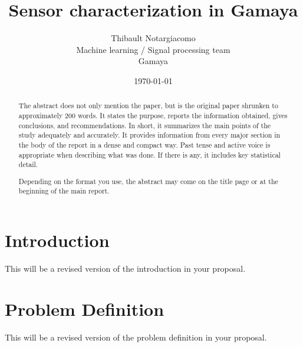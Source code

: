 \documentclass[peerreview]{IEEEtran}
\begin{document}
\title{Sensor characterization in Gamaya}



\author{Thibault Notargiacomo \\
Machine learning / Signal processing team\\
Gamaya\\
}
\date{\today}

\maketitle
\tableofcontents
\listoffigures
\listoftables

\IEEEpeerreviewmaketitle
\begin{abstract}
The abstract does not only mention the paper, but is the original paper shrunken to approximately 200 words. It states the purpose, reports the information obtained, gives conclusions, and recommendations. In short, it summarizes the main points of the study adequately and accurately. It provides information from every major section in the body of the report in a dense and compact way. Past tense and active voice is appropriate when describing what was done. If there is any, it includes key statistical detail.  

Depending on the format you use, the abstract may come on the title page or at the beginning of the main report.

\end{abstract}





\section{Introduction}
This will be a revised version of the introduction in your proposal.

\section{Problem Definition}
This will be a revised version of the problem definition in your proposal.
\end{document}
